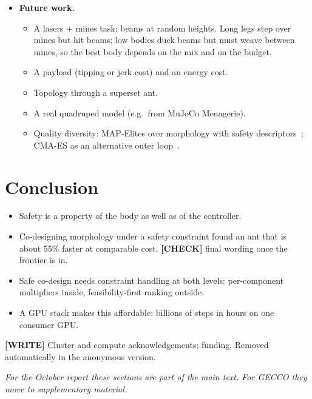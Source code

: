 \documentclass[sigconf,review]{acmart}
\newcommand{\statustag}[2]{\textcolor{#1}{\textsf{\scriptsize\bfseries[#2]}}}
\newcommand{\CHECK}{\statustag{orange!85!black}{CHECK}\hspace{0.3em}}
\newcommand{\WRITE}{\statustag{blue!70!black}{WRITE}\hspace{0.3em}}
\newcommand{\sectarget}[1]{\par\noindent{\color{gray}\sffamily\scriptsize Target length: #1}\par\smallskip}
\begin{document}
\begin{itemize}
\begin{enumerate}
  \end{enumerate}
\item \textbf{Future work.}
  \begin{itemize}
  \item A lasers + mines task: beams at random heights. Long legs step over mines but hit beams; low bodies duck beams but must weave between mines, so the best body depends on the mix and on the budget.
  \item A payload (tipping or jerk cost) and an energy cost.
  \item Topology through a superset ant.
  \item A real quadruped model (e.g.\ from MuJoCo Menagerie).
  \item Quality diversity: MAP-Elites over morphology with safety descriptors~\cite{mouret2015illuminating}; CMA-ES as an alternative outer loop~\cite{hansen2001completely}.
  \end{itemize}
\end{itemize}

\section{Conclusion}
\label{sec:conclusion}
\sectarget{0.25 page}
\begin{itemize}
\item Safety is a property of the body as well as of the controller.
\item Co-designing morphology under a safety constraint found an ant that is about 55\% faster at comparable cost. \CHECK{} final wording once the frontier is in.
\item Safe co-design needs constraint handling at both levels: per-component multipliers inside, feasibility-first ranking outside.
\item A GPU stack makes this affordable: billions of steps in hours on one consumer GPU.
\end{itemize}

\begin{acks}
\WRITE{} Cluster and compute acknowledgements; funding. Removed automatically in the anonymous version.
\end{acks}




\appendix
\noindent\textit{For the October report these sections are part of the main text. For GECCO they move to supplementary material.}
\end{document}
